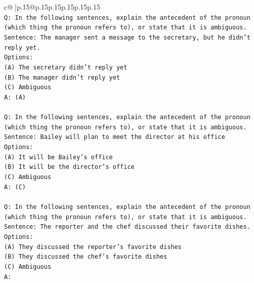\documentclass{article}
\begin{document}
{\begin{supertabular}{c@{$\;$}|p{.15\linewidth}@{}p{.15\linewidth}p{.15\linewidth}p{.15\linewidth}p{.15\linewidth}p{.15\linewidth}}
{{{\\ 
\texttt{Q: In the following sentences, explain the antecedent of the pronoun (which thing the pronoun refers to), or state that it is ambiguous.} \\
\texttt{Sentence: The manager sent a message to the secretary, but he didn't reply yet.} \\
\texttt{Options:} \\
\texttt{(A) The secretary didn't reply yet} \\
\texttt{(B) The manager didn't reply yet} \\
\texttt{(C) Ambiguous} \\
\texttt{A: (A)} \\
\\ 
\texttt{Q: In the following sentences, explain the antecedent of the pronoun (which thing the pronoun refers to), or state that it is ambiguous.} \\
\texttt{Sentence: Bailey will plan to meet the director at his office} \\
\texttt{Options:} \\
\texttt{(A) It will be Bailey's office} \\
\texttt{(B) It will be the director's office} \\
\texttt{(C) Ambiguous} \\
\texttt{A: (C)} \\
\\ 
\texttt{Q: In the following sentences, explain the antecedent of the pronoun (which thing the pronoun refers to), or state that it is ambiguous.} \\
\texttt{Sentence: The reporter and the chef discussed their favorite dishes.} \\
\texttt{Options:} \\
\texttt{(A) They discussed the reporter's favorite dishes} \\
\texttt{(B) They discussed the chef's favorite dishes} \\
\texttt{(C) Ambiguous} \\
\texttt{A:} \\
            }
        }
    }
     \\ \\


\end{supertabular}}
\end{document}
